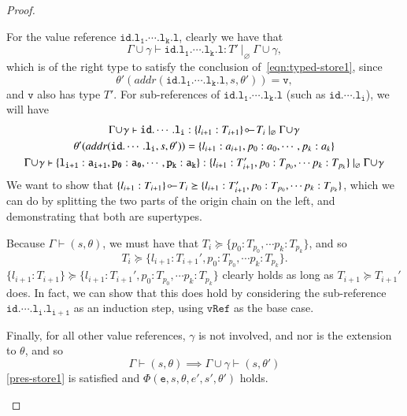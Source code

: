 \begin{proof}
\begin{case}[Assign3]
\begin{subcase}[PropAssignType]
	  For the value reference $\mathtt{id.l_1.\cdots.l_k.l}$, clearly we have that
	  $$\Gamma\!\cup\!\gamma\vdash\mathtt{id.l_1.\cdots.l_k.l}:T'\ |_\varnothing\ \Gamma\!\cup\!\gamma,$$
	  which is of the right type to satisfy the conclusion
	  of~\eqref{eqn:typed-store1}, since
	  $$\theta'(addr(\mathtt{id.l_1.\cdots.l_k.l},s, \theta')) = \mathtt{v},$$
	  and $\mathtt{v}$ also has type $T'$.
	  For sub-references of $\mathtt{id.l_1.\cdots.l_k.l}$ (such as $\mathtt{id.\cdots.l_i}$), we will have
	  \begin{gather*}
		\Gamma\!\cup\!\gamma\vdash\mathtt{id.\cdots.l_i}:\{l_{i+1}:T_{i+1}\}\orig T_i\ |_\varnothing\ \Gamma\!\cup\!\gamma \\
		\theta'(addr(\mathtt{id.\cdots.l_i},s,\theta'))	= \{l_{i+1}:a_{i+1}, p_0:a_0,\cdots,p_k:a_k\} \\
		\Gamma\!\cup\!\gamma\vdash\mathtt{\{l_{i+1}:a_{i+1}, p_0:a_0,\cdots,p_k:a_k\}} 
		:\{l_{i+1}:T_{i+1}', p_0:T_{p_0},\cdots p_k:T_{p_k}\}\ |_\varnothing\ \Gamma\!\cup\!\gamma
	  \end{gather*}
	  We want to show that $\{l_{i+1}:T_{i+1}\}\orig T_i\succeq \{l_{i+1}:T_{i+1}', p_0:T_{p_0},\cdots p_k:T_{p_k}\}$, which we can 
	  do by splitting the two parts of the origin chain on the left, and demonstrating that both
	  are supertypes.

	  Because $\Gamma\vdash(s,\theta)$, we must have that $T_i\succeq\{p_0:T_{p_0},\cdots p_k:T_{p_k}\}$, and so 
	  $$T_i\succeq\{l_{i+1}:T_{i+1}', p_0:T_{p_0},\cdots p_k:T_{p_k}\}.$$
	  $\{l_{i+1}:T_{i+1}\}\succeq \{l_{i+1}:T_{i+1}', p_0:T_{p_0},\cdots p_k:T_{p_k}\}$ clearly
	  holds as long as $T_{i+1}\succeq T_{i+1}'$ does. In fact, we can show that this does hold
	  by considering the sub-reference $\mathtt{id.\cdots.l_i.l_{i+1}}$ as an induction
	  step, using $\mathtt{vRef}$ as the base case.

	  Finally, for all other value references, $\gamma$ is not involved, and
	  nor is the extension to $\theta$, and so
	  $$\Gamma\vdash(s,\theta)\implies\Gamma\!\cup\!\gamma\vdash(s,\theta')$$ 
	  \eqref{pres-store1} is satisfied and $\Phi(\mathtt{e},s,\theta,e',s',\theta')$ holds.

	\end{subcase}
  \end{case}


\end{proof}
